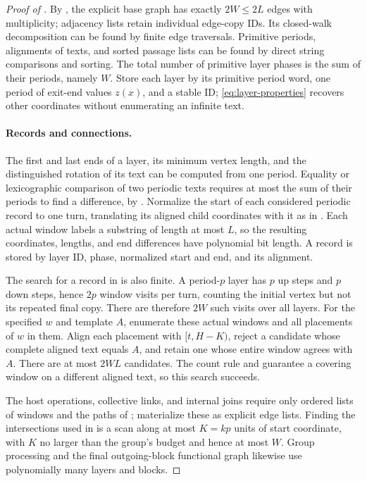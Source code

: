 \begin{proof}[Proof of ]
By , the explicit base graph has exactly $2W\le2L$ edges with multiplicity; adjacency lists retain individual edge-copy IDs. Its closed-walk decomposition can be found by finite edge traversals. Primitive periods, alignments of texts, and sorted passage lists can be found by direct string comparisons and sorting. The total number of primitive layer phases is the sum of their periods, namely $W$. Store each layer by its primitive period word, one period of exit-end values $z(x)$, and a stable ID; \eqref{eq:layer-properties} recovers other coordinates without enumerating an infinite text.

\paragraph{Records and connections.}
The first and last ends of a layer, its minimum vertex length, and the distinguished rotation of its text can be computed from one period. Equality or lexicographic comparison of two periodic texts requires at most the sum of their periods to find a difference, by . Normalize the start of each considered periodic record to one turn, translating its aligned child coordinates with it as in . Each actual window labels a substring of length at most $L$, so the resulting coordinates, lengths, and end differences have polynomial bit length. A record is stored by layer ID, phase, normalized start and end, and its alignment.

The search for a record in  is also finite. A period-$p$ layer has $p$ up steps and $p$ down steps, hence $2p$ window visits per turn, counting the initial vertex but not its repeated final copy. There are therefore $2W$ such visits over all layers. For the specified $w$ and template $A$, enumerate these actual windows and all placements of $w$ in them. Align each placement with $[t,H-K)$, reject a candidate whose complete aligned text equals $A$, and retain one whose entire window agrees with $A$. There are at most $2WL$ candidates. The count rule and  guarantee a covering window on a different aligned text, so this search succeeds.

The host operations, collective links, and internal joins require only ordered lists of windows and the paths of ; materialize these as explicit edge lists. Finding the intersections used in  is a scan along at most $K=kp$ units of start coordinate, with $K$ no larger than the group's budget and hence at most $W$. Group processing and the final outgoing-block functional graph likewise use polynomially many layers and blocks.


\end{proof}
